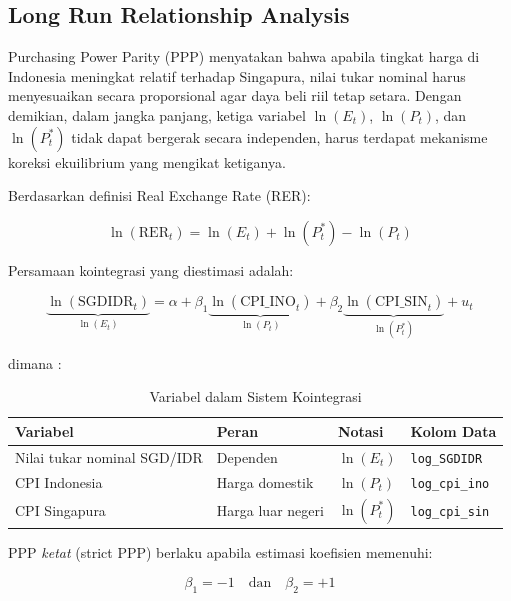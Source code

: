 \documentclass[12pt]{article}
\begin{document}
\subsection{Long Run Relationship Analysis}

Purchasing Power Parity (PPP) menyatakan bahwa apabila tingkat harga di Indonesia meningkat 
relatif terhadap Singapura, nilai tukar nominal harus menyesuaikan secara proporsional agar 
daya beli riil tetap setara. Dengan demikian, dalam jangka panjang, ketiga variabel 
$\ln(E_t)$, $\ln(P_t)$, dan $\ln(P^*_t)$ tidak dapat bergerak secara independen, harus terdapat 
mekanisme koreksi ekuilibrium yang mengikat ketiganya. 

Berdasarkan definisi Real Exchange Rate (RER):

\begin{equation}
    \ln(\text{RER}_t) = \ln(E_t) + \ln(P^*_t) - \ln(P_t)
\end{equation}

Persamaan kointegrasi yang diestimasi adalah:

\begin{equation}
    \underbrace{\ln(\text{SGDIDR}_t)}_{\ln(E_t)} = \alpha + \beta_1 \underbrace{\ln(\text{CPI\_INO}_t)}_{\ln(P_t)} + \beta_2 \underbrace{\ln(\text{CPI\_SIN}_t)}_{\ln(P^*_t)} + u_t
\end{equation}

\noindent dimana :



\begin{table}[H]
    \centering
    \caption{Variabel dalam Sistem Kointegrasi}
    \begin{tabular}{llll}
        \toprule
        Variabel & Peran & Notasi & Kolom Data \\
        \midrule
        Nilai tukar nominal SGD/IDR & Dependen  & $\ln(E_t)$    & \texttt{log\_SGDIDR} \\
        CPI Indonesia               & Harga domestik & $\ln(P_t)$    & \texttt{log\_cpi\_ino} \\
        CPI Singapura               & Harga luar negeri & $\ln(P^*_t)$  & \texttt{log\_cpi\_sin} \\
        \bottomrule
    \end{tabular}
\end{table}
PPP \textit{ketat} (strict PPP) berlaku apabila estimasi koefisien memenuhi:

\begin{equation}
    \beta_1 = -1 \quad \text{dan} \quad \beta_2 = +1
\end{equation}
\end{document}
